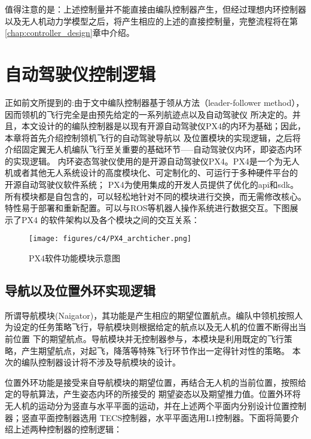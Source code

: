 值得注意的是：上述控制量并不能直接由编队控制器产生，但经过理想内环控制器以及无人机动力学模型之后，将产生相应的上述的直接控制量，完整流程将在第\ref{chap:controller_design}章中介绍。
\section{自动驾驶仪控制逻辑}
正如前文所提到的:由于文中编队控制器基于领从方法（leader-follower method），因而领机的飞行完全是由预先给定的一系列航迹点以及自动驾驶仪
所决定的。并且，本文设计的的编队控制器是以现有开源自动驾驶仪PX4的内环为基础；因此，本章将首先介绍控制领机飞行的自动驾驶导航以
及位置模块的实现逻辑，之后将介绍固定翼无人机编队飞行至关重要的基础环节-----自动驾驶仪内环，即姿态内环的实现逻辑。
内环姿态驾驶仪使用的是开源自动驾驶仪PX4。PX4是一个为无人机或者其他无人系统设计的高度模块化、可定制化的、可运行于多种硬件平台的
开源自动驾驶仪软件系统；
PX4为使用集成的开发人员提供了优化的api和sdk。所有模块都是自包含的，可以轻松地针对不同的模块进行交换，而无需修改核心。特性易于部署和重新配置。可以与ROS等机器人操作系统进行数据交互。下图展示了PX4
的软件架构以及各个模块之间的交互关系：
\begin{figure}[H]
    \centering
    \texttt{[image: figures/c4/PX4\_archticher.png]}
    \caption{PX4软件功能模块示意图}\label{fig:PX4_archticher.png}
\end{figure}
\subsection{导航以及位置外环实现逻辑}
所谓导航模块(Naigator)，其功能是产生相应的期望位置航点。编队中领机按照人为设定的任务策略飞行，导航模块则根据给定的航点以及无人机的位置不断得出当前位置
下的期望航点。导航模块并无控制器参与，本模块是利用既定的飞行策略，产生期望航点，对起飞，降落等特殊飞行环节作出一定得针对性的策略。
本次的编队控制器设计将不涉及导航模块的设计。

位置外环功能是接受来自导航模块的期望位置，再结合无人机的当前位置，按照给定的导航算法，产生姿态内环的所接受的
期望姿态以及期望推力值。位置外环将无人机的运动分为竖直与水平平面的运动，并在上述两个平面内分别设计位置控制器；竖直平面控制器选用
TECS控制器，水平平面选用L1控制器。下面将简要介绍上述两种控制器的控制逻辑：

